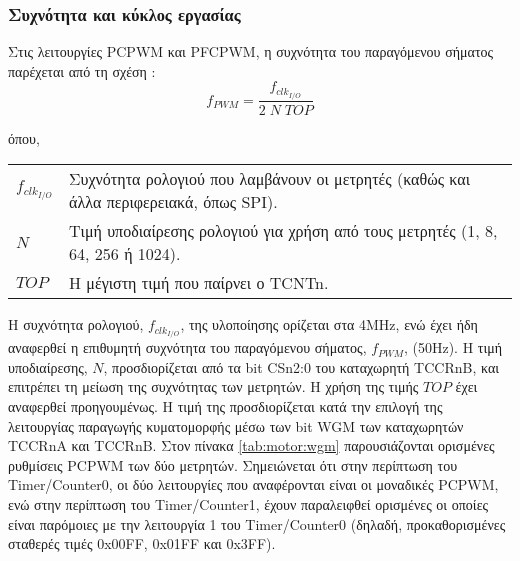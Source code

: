 \subsubsection{Συχνότητα και κύκλος εργασίας}

Στις λειτουργίες PCPWM και PFCPWM, η συχνότητα του παραγόμενου σήματος παρέχεται
από τη σχέση \parencite[102,128,129]{atmel13}:
\begin{equation}
\label{eq:motor:f_pwm}
f_{PWM} = \frac{f_{clk_{I/O}}} {2\;N\;TOP}
\end{equation}

\noindent όπου, \\
\begin{tabu}{X[-1] @{ : }  X}
$f_{clk_{I/O}}$ & Συχνότητα ρολογιού που λαμβάνουν οι μετρητές (καθώς και
                  άλλα περιφερειακά, όπως SPI).                               \\
$N$             & Τιμή υποδιαίρεσης ρολογιού για χρήση από τους μετρητές (1,
                  8, 64, 256 ή 1024).                                         \\
$TOP$           & Η μέγιστη τιμή που παίρνει ο TCNTn.
\end{tabu}

Η συχνότητα ρολογιού, $f_{clk_{I/O}}$, της υλοποίησης ορίζεται στα 4MHz, ενώ
έχει ήδη αναφερθεί η επιθυμητή συχνότητα του παραγόμενου σήματος, $f_{PWM}$,
(50Hz). Η τιμή υποδιαίρεσης, $N$, προσδιορίζεται από τα bit CSn2:0 του
καταχωρητή TCCRnB, και επιτρέπει τη μείωση της συχνότητας των μετρητών. Η χρήση
της τιμής $TOP$ έχει αναφερθεί προηγουμένως. Η τιμή της προσδιορίζεται κατά την
επιλογή της λειτουργίας παραγωγής κυματομορφής μέσω των bit WGM των καταχωρητών
TCCRnA και TCCRnB. Στον πίνακα \ref{tab:motor:wgm} παρουσιάζονται ορισμένες
ρυθμίσεις PCPWM των δύο μετρητών. Σημειώνεται ότι στην περίπτωση του
\textenglish{Timer\slash Counter0}, οι δύο λειτουργίες που αναφέρονται είναι οι
μοναδικές PCPWM, ενώ στην περίπτωση του \textenglish{Timer\slash Counter1},
έχουν παραλειφθεί ορισμένες οι οποίες είναι παρόμοιες με την λειτουργία 1 του
\textenglish{Timer\slash Counter0} (δηλαδή, προκαθορισμένες σταθερές τιμές
0x00FF, 0x01FF και 0x3FF).

